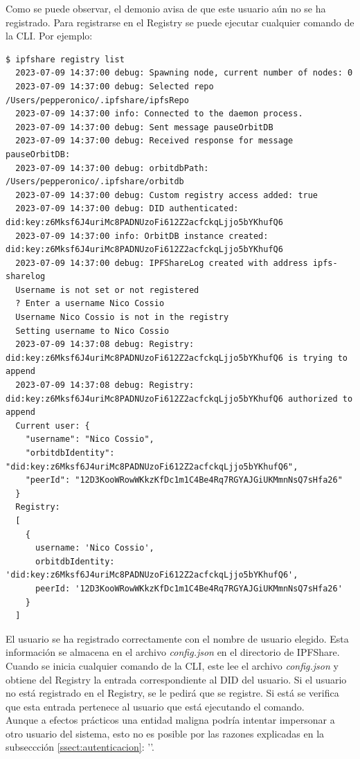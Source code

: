 Como se puede observar, el demonio avisa de que este usuario aún no se ha registrado. Para registrarse en el Registry se puede ejecutar cualquier comando
de la CLI. Por ejemplo:

\begin{verbatim}
$ ipfshare registry list
  2023-07-09 14:37:00 debug: Spawning node, current number of nodes: 0
  2023-07-09 14:37:00 debug: Selected repo /Users/pepperonico/.ipfshare/ipfsRepo
  2023-07-09 14:37:00 info: Connected to the daemon process.
  2023-07-09 14:37:00 debug: Sent message pauseOrbitDB
  2023-07-09 14:37:00 debug: Received response for message pauseOrbitDB:
  2023-07-09 14:37:00 debug: orbitdbPath: /Users/pepperonico/.ipfshare/orbitdb
  2023-07-09 14:37:00 debug: Custom registry access added: true
  2023-07-09 14:37:00 debug: DID authenticated: did:key:z6Mksf6J4uriMc8PADNUzoFi612Z2acfckqLjjo5bYKhufQ6
  2023-07-09 14:37:00 info: OrbitDB instance created: did:key:z6Mksf6J4uriMc8PADNUzoFi612Z2acfckqLjjo5bYKhufQ6
  2023-07-09 14:37:00 debug: IPFShareLog created with address ipfs-sharelog
  Username is not set or not registered
  ? Enter a username Nico Cossio
  Username Nico Cossio is not in the registry 
  Setting username to Nico Cossio
  2023-07-09 14:37:08 debug: Registry: did:key:z6Mksf6J4uriMc8PADNUzoFi612Z2acfckqLjjo5bYKhufQ6 is trying to append
  2023-07-09 14:37:08 debug: Registry: did:key:z6Mksf6J4uriMc8PADNUzoFi612Z2acfckqLjjo5bYKhufQ6 authorized to append
  Current user: {
    "username": "Nico Cossio",
    "orbitdbIdentity": "did:key:z6Mksf6J4uriMc8PADNUzoFi612Z2acfckqLjjo5bYKhufQ6",
    "peerId": "12D3KooWRowWKkzKfDc1m1C4Be4Rq7RGYAJGiUKMmnNsQ7sHfa26"
  }
  Registry:
  [
    {
      username: 'Nico Cossio',
      orbitdbIdentity: 'did:key:z6Mksf6J4uriMc8PADNUzoFi612Z2acfckqLjjo5bYKhufQ6',
      peerId: '12D3KooWRowWKkzKfDc1m1C4Be4Rq7RGYAJGiUKMmnNsQ7sHfa26'
    }
  ]
\end{verbatim}

El usuario se ha registrado correctamente con el nombre de usuario elegido. Esta información se almacena en el archivo \textit{config.json} en el directorio de IPFShare. Cuando se inicia cualquier comando de la CLI, este lee el archivo \textit{config.json} y obtiene del Registry
la entrada correspondiente al DID del usuario. Si el usuario no está registrado en el Registry, se le pedirá que se registre. Si está se verifica
que esta entrada pertenece al usuario que está ejecutando el comando.
\\ Aunque a efectos prácticos una entidad maligna podría intentar impersonar a otro usuario del sistema, esto no es posible por las razones explicadas en 
la subseccción \ref{ssect:autenticacion}: ''.

